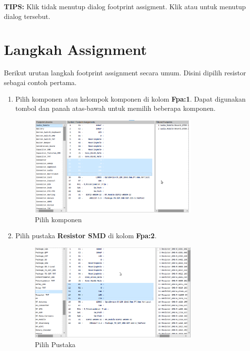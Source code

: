 \documentclass[12pt]{book}
\begin{document}
	\textbf{TIPS:} Klik  tidak menutup dialog footprint assigment.
	Klik  atau  untuk menutup dialog tersebut.\\

	\section{Langkah Assignment}

	Berikut urutan langkah footprint assignment secara umum.
	Disini dipilih resistor sebagai contoh pertama.

	\begin{enumerate}
		\item Pilih komponen atau kelompok komponen di kolom \textbf{Fpa:1}.
		Dapat digunakan tombol  dan panah atas-bawah untuk memilih beberapa komponen.

		\begin{figure}[!ht]
			\centering
			\includegraphics[width=0.8\textwidth]{images/fpa/fpa_2}
			\caption{Pilih komponen}
		\end{figure}

		\newpage
		\item Pilih pustaka \textbf{Resistor SMD} di kolom \textbf{Fpa:2}.

		\begin{figure}[!ht]
			\centering
			\includegraphics[width=0.8\textwidth]{images/fpa/fpa_3}
			\caption{Pilih Pustaka}
		\end{figure}


\end{enumerate}
\end{document}
